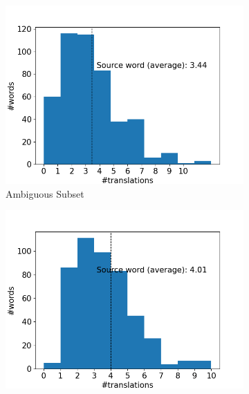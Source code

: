 \begin{figure}[!htb]
     \centering
     
     \begin{subfigure}{0.49\textwidth}
         \centering
         \includegraphics[width=\textwidth]{figures/alignment/align_sampling/word_translations_original.png}
         \caption{Ambiguous Subset}
     \end{subfigure}
     \hfill
     \begin{subfigure}{0.49\textwidth}
         \centering
         \includegraphics[width=\textwidth]{figures/alignment/align_sampling/word_translations_male.png}

\end{subfigure}
\end{figure}
